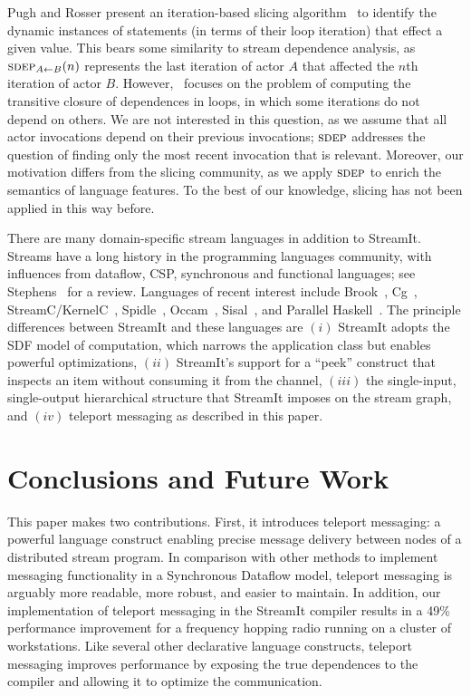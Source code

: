 \documentclass{sig-alternate}
\begin{document}
Pugh and Rosser present an iteration-based slicing
algorithm~\cite{pugh97slice} to identify the dynamic instances of
statements (in terms of their loop iteration) that effect a given
value.  This bears some similarity to stream dependence analysis, as
$\sdepf{A}{B}(n)$ represents the last iteration of actor $A$ that
affected the $n$th iteration of actor $B$.
However,~\cite{pugh97slice} focuses on the problem of computing the
transitive closure of dependences in loops, in which some iterations
do not depend on others.  We are not interested in this question, as
we assume that all actor invocations depend on their previous
invocations; $\textsc{sdep}$ addresses the question of finding only the most
recent invocation that is relevant.  Moreover, our motivation differs
from the slicing community, as we apply $\textsc{sdep}$ to enrich the
semantics of language features.  To the best of our knowledge, slicing
has not been applied in this way before.

There are many domain-specific stream languages in addition to
StreamIt.  Streams have a long history in the programming languages
community, with influences from dataflow, CSP, synchronous and
functional languages; see Stephens~\cite{survey97} for a review.
Languages of recent interest include Brook~\cite{brook04},
Cg~\cite{cg03}, StreamC/KernelC~\cite{imagine03ieee},
Spidle~\cite{spidle02}, Occam~\cite{occammanual}, Sisal~\cite{sisal},
and Parallel Haskell~\cite{ph}.  The principle differences between
StreamIt and these languages are $(i)$ StreamIt adopts the SDF model of
computation, which narrows the application class but enables powerful
optimizations, $(ii)$ StreamIt's support for a ``peek'' construct that
inspects an item without consuming it from the channel, $(iii)$ the
single-input, single-output hierarchical structure that StreamIt
imposes on the stream graph, and $(iv)$ teleport messaging as
described in this paper.

\section{Conclusions and Future Work}
\label{sec:conclusion}

This paper makes two contributions.  First, it introduces teleport
messaging: a powerful language construct enabling precise message
delivery between nodes of a distributed stream program.  In comparison
with other methods to implement messaging functionality in a
Synchronous Dataflow model, teleport messaging is arguably more
readable, more robust, and easier to maintain.  In addition, our
implementation of teleport messaging in the StreamIt compiler results
in a 49\% performance improvement for a frequency hopping radio
running on a cluster of workstations.  Like several other declarative
language constructs, teleport messaging improves performance by
exposing the true dependences to the compiler and allowing it to
optimize the communication.
\end{document}

